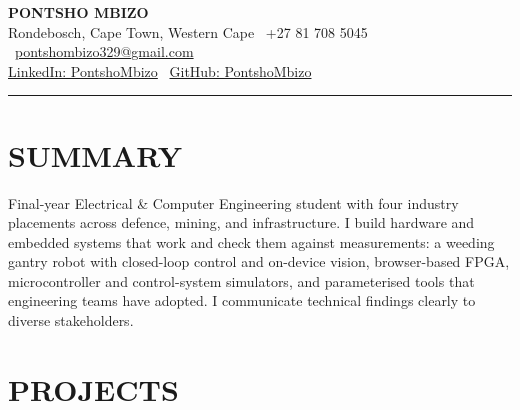 \documentclass[10pt,a4paper]{article}
\begin{document}
\begin{center}
  {\LARGE\bfseries\color{accent} PONTSHO MBIZO}\\[3pt]
  {\small
    Rondebosch, Cape Town, Western Cape
    \textbullet\ +27 81 708 5045
    \textbullet\ 
    \href{mailto:pontshombizo329@gmail.com}{pontshombizo329@gmail.com}
  }\\[1pt]
  {\small
    \href{https://www.linkedin.com/in/PontshoMbizo/}{LinkedIn: PontshoMbizo}
    \textbullet\ 
    \href{https://github.com/PontshoMbizo}{GitHub: PontshoMbizo}
  }
\end{center}

\vspace{1pt}
\textcolor{accent}{\rule{\linewidth}{0.55pt}}

\section{SUMMARY}

Final-year Electrical \& Computer Engineering student with four industry placements across defence, mining, and infrastructure. I build hardware and embedded systems that work and check them against measurements: a weeding gantry robot with closed-loop control and on-device vision, browser-based FPGA, microcontroller and control-system simulators, and parameterised tools that engineering teams have adopted. I communicate technical findings clearly to diverse stakeholders.

\section{PROJECTS}
\end{document}
